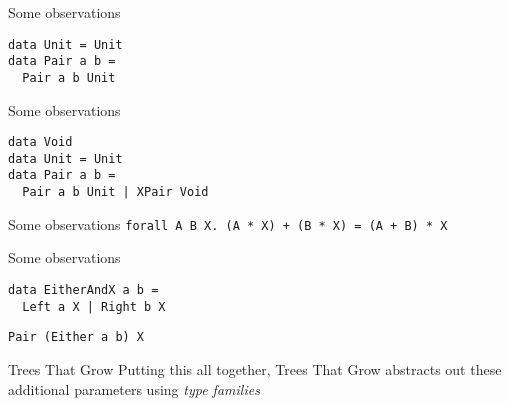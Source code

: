 \begin{frame}[fragile]
\begin{block}{Some observations}
\begin{lstlisting}[style=haskell]
data Unit = Unit
data Pair a b =
  Pair a b Unit
\end{lstlisting}
\end{block}
\end{frame}

\begin{frame}[fragile]
\begin{block}{Some observations}
\begin{lstlisting}[style=haskell]
data Void
data Unit = Unit
data Pair a b =
  Pair a b Unit | XPair Void
\end{lstlisting}
\end{block}
\end{frame}

\begin{frame}[fragile]
\begin{block}{Some observations}
\lstinline{forall A B X. (A * X) + (B * X) = (A + B) * X}
\end{block}
\end{frame}

\begin{frame}[fragile]
\begin{block}{Some observations}
\begin{lstlisting}[style=haskell]
data EitherAndX a b =
  Left a X | Right b X
\end{lstlisting}

\begin{lstlisting}[style=haskell]
Pair (Either a b) X
\end{lstlisting}
\end{block}
\end{frame}

\begin{frame}[fragile]
\begin{block}{Trees That Grow}
Putting this all together, Trees That Grow abstracts out these additional parameters using \emph{type families}
\end{block}
\end{frame}
